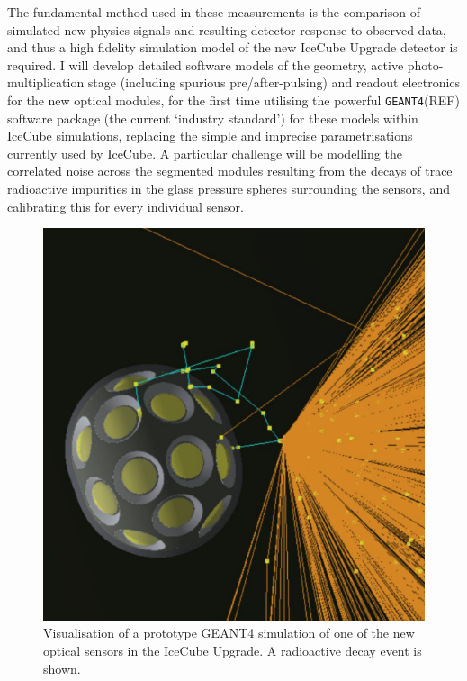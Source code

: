 \documentclass[a4paper,11pt]{article}
\begin{document}
The fundamental method used in these measurements is the comparison of simulated new physics signals and resulting detector response to observed data, and thus a high fidelity simulation model of the new IceCube Upgrade detector is required. I will develop detailed software models of the geometry, active photo-multiplication stage (including spurious pre/after-pulsing) and readout electronics for the new optical modules, for the first time utilising the powerful \texttt{GEANT4}(REF) software package (the current `industry standard') for these models within IceCube simulations, replacing the simple and imprecise parametrisations currently used by IceCube. A particular challenge will be modelling the correlated noise across the segmented modules resulting from the decays of trace radioactive impurities in the glass pressure spheres surrounding the sensors, and calibrating this for every individual sensor. 

\begin{figure} %
    \centering
    \includegraphics[trim=0.0cm 0.0cm 0.cm 1.0cm, clip=true, width=\linewidth]{images/mDOM_noise.png}
    \caption{Visualisation of a prototype GEANT4 simulation of one of the new optical sensors in the IceCube Upgrade. A radioactive decay event is shown.}
    \label{fig:mDOM_sim}
\end{figure}
\end{document}
